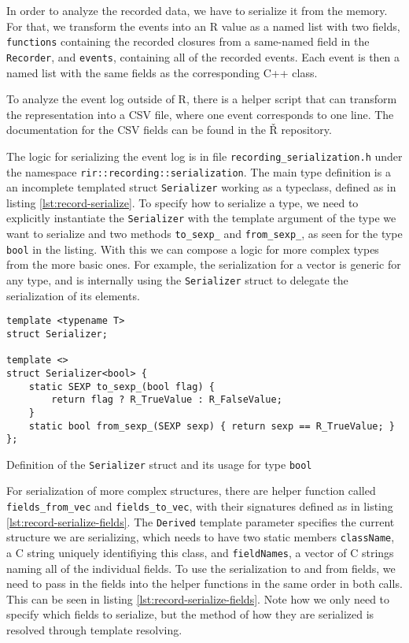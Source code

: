 In order to analyze the recorded data, we have to serialize it from the memory. For that, we transform the events into an R value as a named list with two fields, \texttt{functions} containing the recorded closures from a same-named field in the \texttt{Recorder}, and \texttt{events}, containing all of the recorded events. Each event is then a named list with the same fields as the corresponding C++ class.

To analyze the event log outside of R, there is a helper script that can transform the representation into a CSV file, where one event corresponds to one line. The documentation for the CSV fields can be found in the Ř repository\cite[documentation/recording.md]{rsh-github}.

The logic for serializing the event log is in file \texttt{recording\_serialization.h} under the namespace \texttt{rir::recording::serialization}. The main type definition is a an incomplete templated struct \texttt{Serializer} working as a typeclass, defined as in listing \ref{lst:record-serialize}. To specify how to serialize a type, we need to explicitly instantiate the \texttt{Serializer} with the template argument of the type we want to serialize and two methods \texttt{to\_sexp\_} and \texttt{from\_sexp\_}, as seen for the type \texttt{bool} in the listing. With this we can compose a logic for more complex types from the more basic ones. For example, the serialization for a vector is generic for any type, and is internally using the \texttt{Serializer} struct to delegate the serialization of its elements.

\begin{listing}
	\begin{verbatim}
template <typename T>
struct Serializer;

template <>
struct Serializer<bool> {
    static SEXP to_sexp_(bool flag) {
        return flag ? R_TrueValue : R_FalseValue;
    }
    static bool from_sexp_(SEXP sexp) { return sexp == R_TrueValue; }
};
  \end{verbatim}
	\caption{Definition of the \texttt{Serializer} struct and its usage for type \texttt{bool}}\label{lst:record-serialize}
\end{listing}

For serialization of more complex structures, there are helper function called \texttt{fields\_from\_vec} and \texttt{fields\_to\_vec}, with their signatures defined as in listing \ref{lst:record-serialize-fields}. The \texttt{Derived} template parameter specifies the current structure we are serializing, which needs to have two static members \texttt{className}, a C string uniquely identifiying this class, and \texttt{fieldNames}, a vector of C strings naming all of the individual fields. To use the serialization to and from fields, we need to pass in the fields into the helper functions in the same order in both calls. This can be seen in listing \ref{lst:record-serialize-fields}. Note how we only need to specify which fields to serialize, but the method of how they are serialized is resolved through template resolving.

